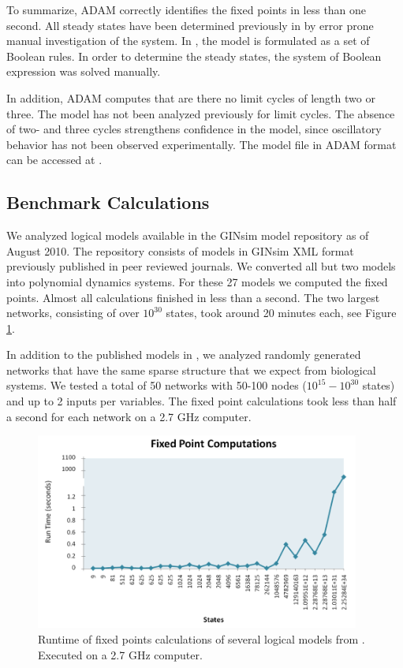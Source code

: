 \documentclass[11pt]{amsart}
\begin{document}
 
 
To summarize, ADAM correctly identifies the fixed points
in less than one second. All steady states have been determined previously in \cite{AO} by error prone manual investigation of the system. In \cite{AO}, the model is formulated as a set of Boolean rules. In order to determine the steady states, the system of Boolean expression was solved manually.
 
In addition, ADAM computes that are there no limit
cycles of length two or three. The model has not been analyzed previously for
limit cycles. The absence of two- and three cycles strengthens confidence in
the model, since oscillatory behavior has not been observed experimentally.
The model file in ADAM format can be accessed at \cite{DrosophilaModel}.
 
\subsection{Benchmark Calculations}
We analyzed logical models
available in the GINsim model repository \cite{GINsimRepo} as of August 2010. The
repository consists of models in GINsim XML format previously published in
peer reviewed journals. We converted all but two models into polynomial
dynamics systems. For these 27 models we computed the fixed points. Almost all
calculations finished in less than a second. The two largest networks,
consisting of over $10^{30}$ states, took around 20 minutes each, see
Figure \ref{fig:chart}.
 
In addition to the published models in \cite{GINsimRepo}, we analyzed
randomly generated networks
that have the same sparse structure that we
expect from biological systems. We tested a total of 50 networks with
50-100 nodes ($10^{15} - 10^{30}$ states) and up to 2 inputs per variables. The
fixed point calculations took less than half a second for each network on
a 2.7 GHz computer.
\begin{figure}[htb]
 \centering
 \includegraphics[width=0.95\textwidth]{GINSimChart.png}
 \caption{Runtime of fixed points calculations of several logical models from
 \cite{GINsimRepo}. Executed on a 2.7 GHz computer.}
 \label{fig:chart}
\end{figure}
 
\end{document}
